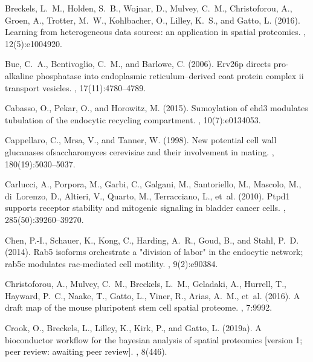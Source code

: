 \documentclass[12pt,english]{article}
\begin{document}
\begin{thebibliography}{}
Breckels, L.~M., Holden, S.~B., Wojnar, D., Mulvey, C.~M., Christoforou, A.,
  Groen, A., Trotter, M.~W., Kohlbacher, O., Lilley, K.~S., and Gatto, L.
  (2016).
\newblock Learning from heterogeneous data sources: an application in spatial
  proteomics.
, 12(5):e1004920.

Bue, C.~A., Bentivoglio, C.~M., and Barlowe, C. (2006).
\newblock Erv26p directs pro-alkaline phosphatase into endoplasmic
  reticulum--derived coat protein complex ii transport vesicles.
, 17(11):4780--4789.

Cabasso, O., Pekar, O., and Horowitz, M. (2015).
\newblock Sumoylation of ehd3 modulates tubulation of the endocytic recycling
  compartment.
, 10(7):e0134053.

Cappellaro, C., Mrsa, V., and Tanner, W. (1998).
\newblock New potential cell wall glucanases ofsaccharomyces cerevisiae and
  their involvement in mating.
, 180(19):5030--5037.

Carlucci, A., Porpora, M., Garbi, C., Galgani, M., Santoriello, M., Mascolo,
  M., di~Lorenzo, D., Altieri, V., Quarto, M., Terracciano, L., et~al. (2010).
\newblock Ptpd1 supports receptor stability and mitogenic signaling in bladder
  cancer cells.
, 285(50):39260--39270.

Chen, P.-I., Schauer, K., Kong, C., Harding, A.~R., Goud, B., and Stahl, P.~D.
  (2014).
\newblock Rab5 isoforms orchestrate a "division of labor" in the endocytic
  network; rab5c modulates rac-mediated cell motility.
, 9(2):e90384.

Christoforou, A., Mulvey, C.~M., Breckels, L.~M., Geladaki, A., Hurrell, T.,
  Hayward, P.~C., Naake, T., Gatto, L., Viner, R., Arias, A.~M., et~al. (2016).
\newblock A draft map of the mouse pluripotent stem cell spatial proteome.
, 7:9992.

Crook, O., Breckels, L., Lilley, K., Kirk, P., and Gatto, L. (2019a).
\newblock A bioconductor workflow for the bayesian analysis of spatial
  proteomics [version 1; peer review: awaiting peer review].
, 8(446).


\end{thebibliography}
\end{document}
